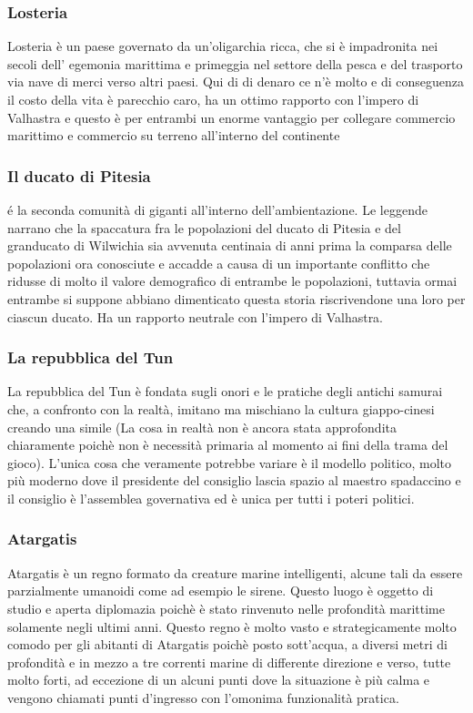 \documentclass[a4paper,12pt]{book}
\begin{document}
\subsubsection{Losteria}
Losteria è un paese governato da un'oligarchia ricca, che si è impadronita nei secoli dell' egemonia marittima e primeggia nel settore della pesca e del trasporto via nave di merci verso altri paesi.
Qui di di denaro ce n'è molto e di conseguenza il costo della vita è parecchio caro, ha un ottimo rapporto con l'impero di Valhastra e questo è per entrambi un enorme vantaggio per collegare commercio marittimo e commercio su terreno all'interno del continente

\subsubsection{Il ducato di Pitesia}
é la seconda comunità di giganti all'interno dell'ambientazione. Le leggende narrano che la spaccatura fra le popolazioni del ducato di Pitesia e del granducato di Wilwichia sia avvenuta centinaia di anni prima la comparsa delle popolazioni ora conosciute e accadde a causa di un importante conflitto che ridusse di molto il valore demografico di entrambe le popolazioni, tuttavia ormai entrambe si suppone abbiano dimenticato questa storia riscrivendone una loro per ciascun ducato. Ha un rapporto neutrale con l'impero di Valhastra.

\subsubsection{La repubblica del Tun}

La repubblica del Tun è fondata sugli onori e le pratiche degli antichi samurai che, a confronto con la realtà, imitano ma mischiano la cultura giappo-cinesi creando una simile (La cosa in realtà non è ancora stata approfondita chiaramente poichè non è necessità primaria al momento ai fini della trama del gioco).
L'unica cosa che veramente potrebbe variare è il modello politico, molto più moderno dove il presidente del consiglio lascia spazio al maestro spadaccino e il consiglio è l'assemblea governativa ed è unica per tutti i poteri politici.

\subsubsection{Atargatis}

Atargatis è un regno formato da creature marine intelligenti, alcune tali da essere parzialmente umanoidi come ad esempio le sirene.
Questo luogo è oggetto di studio e aperta diplomazia poichè è stato rinvenuto nelle profondità marittime solamente negli ultimi anni.
Questo regno è molto vasto e strategicamente molto comodo per gli abitanti di Atargatis poichè posto sott'acqua, a diversi metri di profondità e in mezzo a tre correnti marine di differente direzione e verso, tutte molto forti, ad eccezione di un alcuni punti dove la situazione è più calma e vengono chiamati punti d'ingresso con l'omonima funzionalità pratica.
\end{document}
